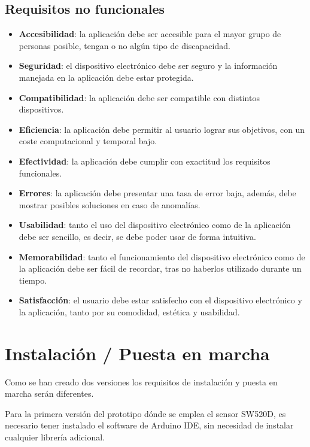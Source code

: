 \subsection{Requisitos no funcionales}
\begin{itemize}
    \item \textbf{Accesibilidad}: la aplicación debe ser accesible para el mayor grupo de personas posible, tengan o no algún tipo de discapacidad.
    \item \textbf{Seguridad}: el dispositivo electrónico debe ser seguro y la información manejada en la aplicación debe estar protegida.
    \item \textbf{Compatibilidad}: la aplicación debe ser compatible con distintos dispositivos.
    \item \textbf{Eficiencia}: la aplicación debe permitir al usuario lograr sus objetivos, con un coste computacional y temporal bajo.
    \item \textbf{Efectividad}: la aplicación debe cumplir con exactitud los requisitos funcionales. 
    \item \textbf{Errores}: la aplicación debe presentar una tasa de error baja, además, debe mostrar posibles soluciones en caso de anomalías.
    \item \textbf{Usabilidad}: tanto el uso del dispositivo electrónico como de la aplicación debe ser sencillo, es decir, se debe poder usar de forma intuitiva.
    \item \textbf{Memorabilidad}: tanto el funcionamiento del dispositivo electrónico como de la aplicación debe ser fácil de recordar, tras no haberlos utilizado durante un tiempo.
    \item \textbf{Satisfacción}: el usuario debe estar satisfecho con el dispositivo electrónico y la aplicación, tanto por su comodidad, estética y usabilidad.


\end{itemize}

\clearpage
\section{Instalación / Puesta en marcha}
Como se han creado dos versiones los requisitos de instalación y puesta en marcha serán diferentes.

Para la primera versión del prototipo dónde se emplea el sensor SW520D\cite{SW520D_1}, es necesario tener instalado el software de Arduino IDE\cite{ArduinoIDE,Arduino1,Arduino2}, sin necesidad de instalar cualquier librería adicional.

